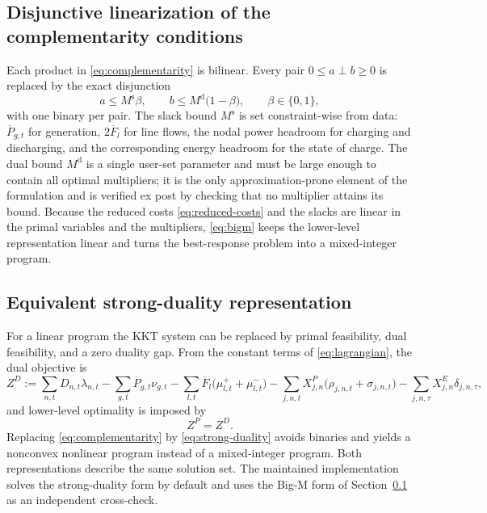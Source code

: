 \documentclass[11pt,a4paper,fleqn]{article}
\numberwithin{equation}{section}
\begin{document}
\subsection{Disjunctive linearization of the complementarity conditions}
\label{sec:bigm}

Each product in \eqref{eq:complementarity} is bilinear. Every pair
$0\leq a\perp b\geq 0$ is replaced by the exact disjunction
\begin{equation}\label{eq:bigm}
a\leq M^{\mathrm{s}}\beta,
\qquad
b\leq M^{\mathrm{d}}\bigl(1-\beta\bigr),
\qquad
\beta\in\{0,1\},
\end{equation}
with one binary per pair. The slack bound $M^{\mathrm{s}}$ is set
constraint-wise from data: $\overline P_{g,t}$ for generation,
$2\overline F_l$ for line flows, the nodal power headroom for charging and
discharging, and the corresponding energy headroom for the state of charge.
The dual bound $M^{\mathrm{d}}$ is a single user-set parameter and must be
large enough to contain all optimal multipliers; it is the only
approximation-prone element of the formulation and is verified ex post by
checking that no multiplier attains its bound. Because the reduced costs
\eqref{eq:reduced-costs} and the slacks are linear in the primal variables and
the multipliers, \eqref{eq:bigm} keeps the lower-level representation linear
and turns the best-response problem into a mixed-integer program.

\subsection{Equivalent strong-duality representation}
\label{sec:strong-duality}

For a linear program the KKT system can be replaced by primal feasibility,
dual feasibility, and a zero duality gap. From the constant terms of
\eqref{eq:lagrangian}, the dual objective is
\begin{equation}\label{eq:dual-objective}
Z^D
:=\sum_{n,t}D_{n,t}\lambda_{n,t}
-\sum_{g,t}\overline P_{g,t}\nu_{g,t}
-\sum_{l,t}\overline F_l\bigl(\mu^+_{l,t}+\mu^-_{l,t}\bigr)
-\sum_{j,n,t}X^P_{j,n}\bigl(\rho_{j,n,t}+\sigma_{j,n,t}\bigr)
-\sum_{j,n,\tau}X^E_{j,n}\delta_{j,n,\tau},
\end{equation}
and lower-level optimality is imposed by
\begin{equation}\label{eq:strong-duality}
Z^P=Z^D.
\end{equation}
Replacing \eqref{eq:complementarity} by \eqref{eq:strong-duality} avoids
binaries and yields a nonconvex nonlinear program instead of a mixed-integer
program. Both representations describe the same solution set. The maintained
implementation solves the strong-duality form by default and uses the
Big-M form of Section~\ref{sec:bigm} as an independent cross-check.
\end{document}
